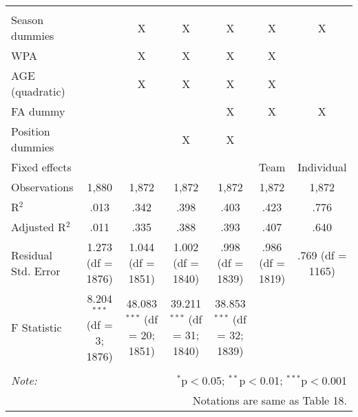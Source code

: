 \begin{table}[H]
\begin{tabular}{@{\extracolsep{5pt}}lcccccc}
  & & & & & & \\
\hline \\[-1.8ex]
Season dummies &  & X & X & X & X & X \\
WPA &  & X & X & X & X &  \\
AGE (quadratic) &  & X & X & X & X &  \\
FA dummy &  &  &  & X & X & X \\
Position dummies &  &  & X & X &  &  \\
Fixed effects &  &  &  &  & Team & Individual \\
Observations & 1,880 & 1,872 & 1,872 & 1,872 & 1,872 & 1,872 \\
R$^{2}$ & .013 & .342 & .398 & .403 & .423 & .776 \\
Adjusted R$^{2}$ & .011 & .335 & .388 & .393 & .407 & .640 \\
Residual Std. Error & 1.273 (df = 1876) & 1.044 (df = 1851) & 1.002 (df = 1840) & .998 (df = 1839) & .986 (df = 1819) & .769 (df = 1165) \\
F Statistic & 8.204$^{***}$ (df = 3; 1876) & 48.083$^{***}$ (df = 20; 1851) & 39.211$^{***}$ (df = 31; 1840) & 38.853$^{***}$ (df = 32; 1839) &  &  \\
\hline
\hline \\[-1.8ex]
\textit{Note:}  & \multicolumn{6}{r}{$^{*}$p$<$0.05; $^{**}$p$<$0.01; $^{***}$p$<$0.001} \\
& \multicolumn{6}{r}{Notations are same as Table 18.} \\
\end{tabular}
\end{table}
